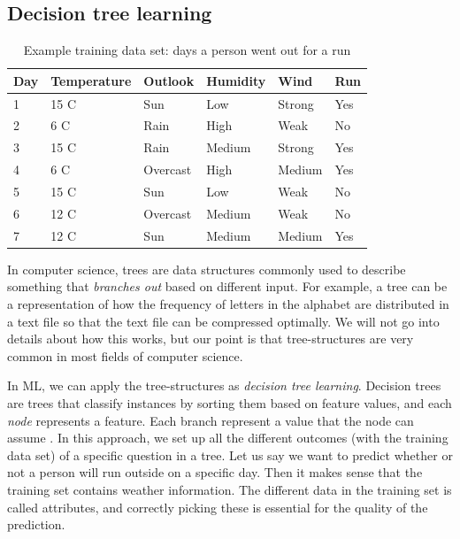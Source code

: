 \subsection{Decision tree learning}
\begin{table}[h]
    \begin{tabular}{| l | l | l | l | l | l |}
    \hline
    \textbf{Day} & \textbf{Temperature} & \textbf{Outlook}   & \textbf{Humidity}  & \textbf{Wind}     & \textbf{Run} \\ \hline
            1    & 15 C                 & Sun                & Low                & Strong            & Yes \\
            2    & 6 C                  & Rain               & High               & Weak              & No  \\
            3    & 15 C                 & Rain               & Medium             & Strong            & Yes \\
            4    & 6 C                  & Overcast           & High               & Medium            & Yes \\
            5    & 15 C                 & Sun                & Low                & Weak              & No  \\
            6    & 12 C                 & Overcast           & Medium             & Weak              & No  \\
            7    & 12 C                 & Sun                & Medium             & Medium            & Yes \\
    \hline
    \end{tabular}
    \caption{Example training data set: days a person went out for a run}
    \label{table:days_running}
\end{table}

In computer science, trees are data structures commonly used to describe something that \textit{branches out} based on different input. For example, 
a tree can be a representation of how the frequency of letters in the alphabet are distributed in a text file so that the text file can be compressed optimally. 
We will not go into details about how this works, but our point is that tree-structures are very common in most fields of computer science. 

In ML, we can apply the tree-structures as \textit{decision tree learning}. Decision trees are trees that classify instances by sorting them based on feature values, and each \textit{node} represents a feature. Each branch represent a value that the node can assume \cite{supervised_learning}.
In this approach, we set up all the different outcomes (with the training data set) of a specific question in a tree. Let us say we want to predict whether or not a person will run outside on a specific day. 
Then it makes sense that the training set contains weather information. The different data in the training set is called attributes, and correctly picking 
these is essential for the quality of the prediction.

